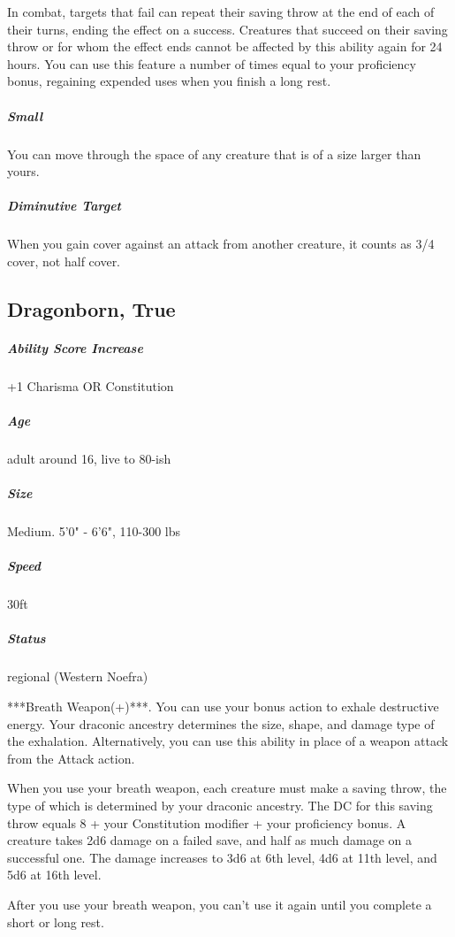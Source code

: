 In combat, targets that fail can repeat their saving throw at the end of each of their turns, ending the effect on a success. Creatures that succeed on their saving throw or for whom the effect ends cannot be affected by this ability again for 24 hours. You can use this feature a number of times equal to your proficiency bonus, regaining expended uses when you finish a long rest.

\subparagraph*{Small}  You can move through the space of any creature that is of a size larger than yours.

\subparagraph*{Diminutive Target}  When you gain cover against an attack from another creature, it counts as 3/4 cover, not half cover.

\subsection{Dragonborn, True}\label{lineage:dragonborn}

\subparagraph*{Ability Score Increase}  +1 Charisma OR Constitution

\subparagraph*{Age}  adult around 16, live to 80-ish

\subparagraph*{Size}  Medium. 5'0" - 6'6", 110-300 lbs

\subparagraph*{Speed}  30ft

\subparagraph*{Status}  regional (Western Noefra)

***Breath Weapon(+)***. You can use your bonus action to exhale destructive energy. Your draconic ancestry determines the size, shape, and damage type of the exhalation. Alternatively, you can use this ability in place of a weapon attack from the Attack action.

When you use your breath weapon, each creature must make a saving throw, the type of which is determined by your draconic ancestry. The DC for this saving throw equals 8 + your Constitution modifier + your proficiency bonus. A creature takes 2d6 damage on a failed save, and half as much damage on a successful one. The damage increases to 3d6 at 6th level, 4d6 at 11th level, and 5d6 at 16th level.

After you use your breath weapon, you can’t use it again until you complete a short or long rest.


